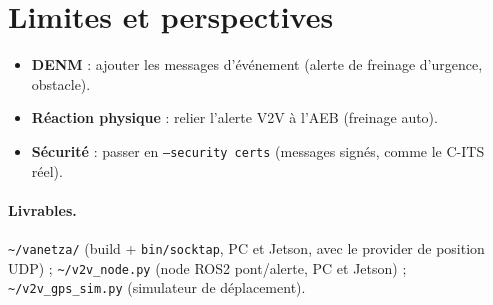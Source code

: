 \documentclass[a4paper,11pt]{article}
\begin{document}
\section{Limites et perspectives}
\begin{itemize}[leftmargin=1.4em]
  \item \textbf{DENM} : ajouter les messages d'événement (alerte de freinage
        d'urgence, obstacle).
  \item \textbf{Réaction physique} : relier l'alerte V2V à l'AEB (freinage auto).
  \item \textbf{Sécurité} : passer en \texttt{--security certs} (messages signés,
        comme le C-ITS réel).
\end{itemize}

\paragraph{Livrables.}
\texttt{\textasciitilde/vanetza/} (build + \texttt{bin/socktap}, PC et Jetson, avec
le provider de position UDP) ; \texttt{\textasciitilde/v2v\_node.py} (node ROS2
pont/alerte, PC et Jetson) ; \texttt{\textasciitilde/v2v\_gps\_sim.py} (simulateur
de déplacement).
\end{document}
